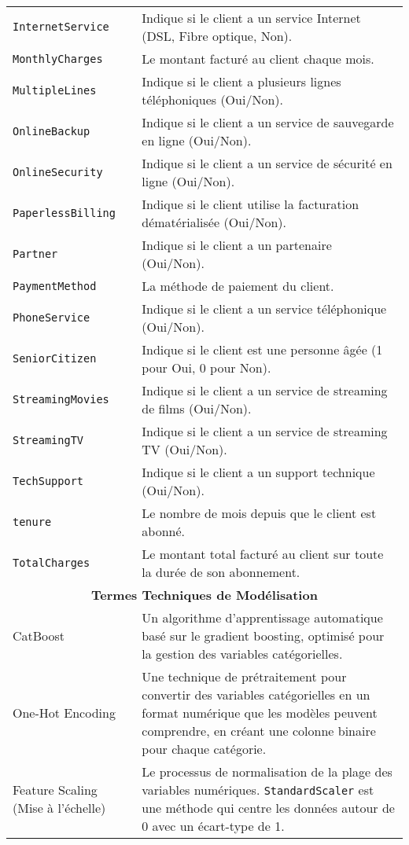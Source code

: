 \begin{longtable}{p{} p{}}
\texttt{InternetService} & Indique si le client a un service Internet (DSL, Fibre optique, Non). \\
\texttt{MonthlyCharges} & Le montant facturé au client chaque mois. \\
\texttt{MultipleLines} & Indique si le client a plusieurs lignes téléphoniques (Oui/Non). \\
\texttt{OnlineBackup} & Indique si le client a un service de sauvegarde en ligne (Oui/Non). \\
\texttt{OnlineSecurity} & Indique si le client a un service de sécurité en ligne (Oui/Non). \\
\texttt{PaperlessBilling} & Indique si le client utilise la facturation dématérialisée (Oui/Non). \\
\texttt{Partner} & Indique si le client a un partenaire (Oui/Non). \\
\texttt{PaymentMethod} & La méthode de paiement du client. \\
\texttt{PhoneService} & Indique si le client a un service téléphonique (Oui/Non). \\
\texttt{SeniorCitizen} & Indique si le client est une personne âgée (1 pour Oui, 0 pour Non). \\
\texttt{StreamingMovies} & Indique si le client a un service de streaming de films (Oui/Non). \\
\texttt{StreamingTV} & Indique si le client a un service de streaming TV (Oui/Non). \\
\texttt{TechSupport} & Indique si le client a un support technique (Oui/Non). \\
\texttt{tenure} & Le nombre de mois depuis que le client est abonné. \\
\texttt{TotalCharges} & Le montant total facturé au client sur toute la durée de son abonnement. \\
\midrule
\multicolumn{2}{c}{\textbf{Termes Techniques de Modélisation}} \\
\midrule
CatBoost & Un algorithme d'apprentissage automatique basé sur le gradient boosting, optimisé pour la gestion des variables catégorielles. \\
\midrule
One-Hot Encoding & Une technique de prétraitement pour convertir des variables catégorielles en un format numérique que les modèles peuvent comprendre, en créant une colonne binaire pour chaque catégorie. \\
\midrule
Feature Scaling (Mise à l'échelle) & Le processus de normalisation de la plage des variables numériques. \texttt{StandardScaler} est une méthode qui centre les données autour de 0 avec un écart-type de 1. \\

\end{longtable}
